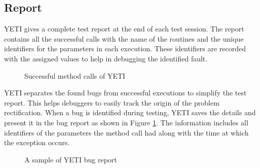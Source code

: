 
\subsection{Report}
YETI gives a complete test report at the end of each test session. The report contains all the successful calls with the name of the routines and the unique identifiers for the parameters in each execution. These identifiers are recorded with the assigned values to help in debugging the identified fault. 
\bigskip
\begin{figure}[H]
	\centering
	\smallskip
	\caption{Successful method calls of YETI}
\end{figure}

YETI separates the found bugs from successful executions to simplify the test report. This helps debuggers to easily track the origin of the problem rectification. When a bug is identified during testing, YETI saves the details and present it in the bug report as shown in Figure \ref{bugReport}. The information includes all identifiers of the parameters the method call had along with the time at which the exception occurs.
\bigskip
\begin{figure}[H]
	\centering
	\smallskip
	\caption{A sample of YETI bug report}
	\label{bugReport}
\end{figure}

